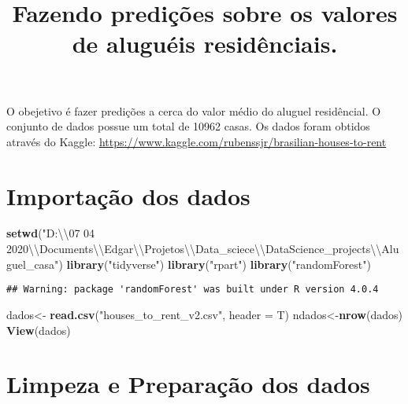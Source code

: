 \documentclass[
]{article}
\title{Fazendo predições sobre os valores de aluguéis residênciais.}
\author{}
\date{\vspace{-2.5em}}
\newenvironment{Shaded}{\begin{snugshade}}{\end{snugshade}}
\newcommand{\CharTok}[1]{\textcolor[rgb]{0.31,0.60,0.02}{#1}}
\newcommand{\DataTypeTok}[1]{\textcolor[rgb]{0.13,0.29,0.53}{#1}}
\newcommand{\KeywordTok}[1]{\textcolor[rgb]{0.13,0.29,0.53}{\textbf{#1}}}
\newcommand{\NormalTok}[1]{#1}
\newcommand{\StringTok}[1]{\textcolor[rgb]{0.31,0.60,0.02}{#1}}
\begin{document}
\maketitle

O obejetivo é fazer predições a cerca do valor médio do aluguel
residêncial. O conjunto de dados possue um total de 10962 casas. Os
dados foram obtidos através do Kaggle:
\url{https://www.kaggle.com/rubenssjr/brasilian-houses-to-rent}

\hypertarget{importauxe7uxe3o-dos-dados}{%
\section{Importação dos dados}\label{importauxe7uxe3o-dos-dados}}

\begin{Shaded}
\begin{Highlighting}[]
\KeywordTok{setwd}\NormalTok{(}\StringTok{"D:}\CharTok{\textbackslash{}\textbackslash{}}\StringTok{07 04 2020}\CharTok{\textbackslash{}\textbackslash{}}\StringTok{Documents}\CharTok{\textbackslash{}\textbackslash{}}\StringTok{Edgar}\CharTok{\textbackslash{}\textbackslash{}}\StringTok{Projetos}\CharTok{\textbackslash{}\textbackslash{}}\StringTok{Data\_sciece}\CharTok{\textbackslash{}\textbackslash{}}\StringTok{DataScience\_projects}\CharTok{\textbackslash{}\textbackslash{}}\StringTok{Aluguel\_casa"}\NormalTok{)}
\KeywordTok{library}\NormalTok{(}\StringTok{"tidyverse"}\NormalTok{)}
\KeywordTok{library}\NormalTok{(}\StringTok{"rpart"}\NormalTok{)}
\KeywordTok{library}\NormalTok{(}\StringTok{"randomForest"}\NormalTok{)}
\end{Highlighting}
\end{Shaded}

\begin{verbatim}
## Warning: package 'randomForest' was built under R version 4.0.4
\end{verbatim}

\begin{Shaded}
\begin{Highlighting}[]
\NormalTok{dados\textless{}{-}}\StringTok{ }\KeywordTok{read.csv}\NormalTok{(}\StringTok{"houses\_to\_rent\_v2.csv"}\NormalTok{, }\DataTypeTok{header =}\NormalTok{ T)}
\NormalTok{ndados\textless{}{-}}\KeywordTok{nrow}\NormalTok{(dados) }
\KeywordTok{View}\NormalTok{(dados)}
\end{Highlighting}
\end{Shaded}

\hypertarget{limpeza-e-preparauxe7uxe3o-dos-dados}{%
\section{Limpeza e Preparação dos
dados}\label{limpeza-e-preparauxe7uxe3o-dos-dados}}
\end{document}
